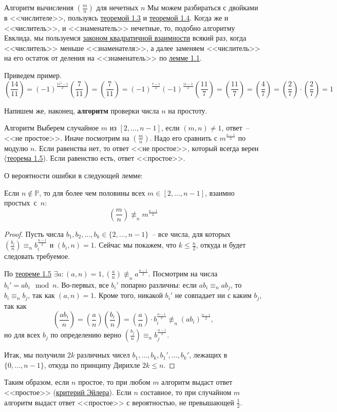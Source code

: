 \begin{algodescription}{Алгоритм вычисления $\left(\frac{m}{n}\right)$ для нечетных $n$}
Мы можем разбираться с двойками в <<числителе>>, пользуясь \hyperlink{multiplicative}{теоремой 1.3} и \hyperlink{twojacobi}{теоремой 1.4}. Когда же и <<числитель>>, и <<знаменатель>> нечетные, то, подобно алгоритму Евклида, мы пользуемся \hyperlink{qreciproc}{законом квадратичной взаимности} всякий раз, когда <<числитель>> меньше <<знаменателя>>, а далее заменяем <<числитель>>  на его остаток от деления на <<знаменатель>> по \hyperlink{aequivb}{лемме 1.1}.
\end{algodescription}

Приведем пример.
$$\left(\frac{14}{11}\right) = (-1)^\frac{11^2-1}{2}\left(\frac{7}{11}\right) = \left(\frac{7}{11}\right) = (-1)^\frac{7-1}{2}(-1)^\frac{11-1}{2}\left(\frac{11}{7}\right) = \left(\frac{11}{7}\right) = \left(\frac{4}{7}\right) = \left(\frac{2}{7}\right)\cdot\left(\frac{2}{7}\right) = 1$$

Напишем же, наконец, \textbf{алгоритм} проверки числа $n$ на простоту.

\begin{algodescription}{Алгоритм}
    Выберем случайное $m$ из $[2,\ldots,n-1]$, если $(m,n)\ne 1$, ответ~-- <<не простое>>. Иначе посмотрим на $\left(\frac{m}{n}\right)$. Надо его сравнить с $m^{\frac{n-1}{2}}$ по модулю $n$. Если равенства нет, то ответ <<не простое>>, который всегда верен (\hyperlink{solovaytest}{теорема 1.5}). Если равенство есть, ответ <<простое>>.
\end{algodescription}

О вероятности ошибки в следующей лемме:
\begin{lemma} Если $n\not\in\mathbb{P}$, то для более чем половины всех $m \in [2, \ldots, n-1]$, взаимно простых~с~$n$: $$\left(\frac{m}{n}\right)\not\equiv_n m^{\frac{n-1}{2}}$$
\end{lemma}
\begin{proof}
Пусть числа $b_1, b_2, \ldots, b_k \in \{2, \ldots, n-1\}$~-- все числа, для которых $\left(\frac{b_i}{n}\right)\equiv_n b_i^\frac{n-1}{2}$ и $(b_i,n)=1$. Сейчас мы покажем, что $k \leq \frac{n}{2}$, откуда и будет следовать требуемое.

По \hyperlink{solovaytest}{теореме 1.5} $\exists a: (a,n)=1, (\frac{a}{n})\not\equiv_n a^\frac{n-1}{2}$. Посмотрим на  числа $b_i' = ab_i \mod {n}$. Во-первых, все $b_i'$ попарно различны: если $ab_i \equiv_n ab_j$, то $b_i \equiv_n b_j$, так как $(a,n)=1$. Кроме того, никакой $b_i'$ не совпадает ни с каким $b_j$, так как
$$\left(\frac{ab_i}{n}\right)=\left(\frac{a}{n}\right)\left(\frac{b_i}{n}\right)=\left(\frac{a}{n}\right)\cdot b_i^\frac{n-1}{2}\not\equiv_n (ab_i)^\frac{n-1}{2},$$
но для всех $b_j$ по определению верно $\left(\frac{b_j}{n}\right) \equiv_n b_j^\frac{n-1}{2}$.

Итак, мы получили $2k$ различных чисел $b_1, \ldots, b_k, b_1', \ldots, b_k'$, лежащих в $\{0, \ldots, n-1\}$, откуда по принципу Дирихле $2k \leq n$.
\end{proof}

Таким образом, если $n$ простое, то при любом $m$ алгоритм выдаст ответ <<простое>> (\hyperlink{euler}{критерий Эйлера}). Если $n$ составное, то при случайном $m$ алгоритм выдаст ответ <<простое>> с вероятностью, не превышающей $\frac{1}{2}$.
